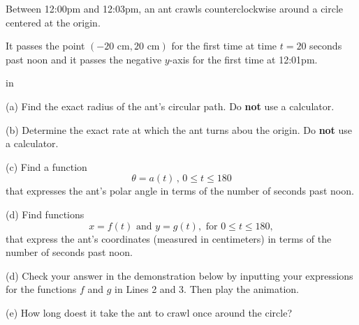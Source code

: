 \documentclass{ximera}
\newcommand{\pskip}{\vskip 0.1 in}
\begin{document}
\begin{question}  \label{Q3dbgdfds5:Motion1}
Between 12:00pm and 12:03pm, an ant crawls counterclockwise around a circle centered at the origin. 

It passes the point $(-20 \text{ cm},20 \text{ cm})$ for the first time at time $t=20$ seconds past noon and it passes the negative $y$-axis for the first time at 12:01pm.

\pskip

(a) Find the exact radius of the ant's circular path. Do {\bf not} use a calculator.

(b) Determine the exact rate at which the ant turns abou the origin.  Do {\bf not} use a calculator.

(c) Find a function 
\[
   \theta = a(t) \, , \, 0\leq t \leq 180
\]
that expresses the ant's polar angle in terms of the number of seconds past noon.

(d) Find functions
\[
   x = f(t) \text{ and } y=g(t) , \text{ for } 0\leq t \leq 180 ,
\]
that express the ant's coordinates (measured in centimeters) in terms of the number of seconds past noon. 

(d) Check your answer in the demonstration below by inputting your expressions for the functions $f$ and $g$ in Lines 2 and 3. Then play the animation.

(e) How long doest it take the ant to crawl once around the circle?

 
\begin{onlineOnly}
    \begin{center}
\end{center}
\end{onlineOnly}


\end{question}
\end{document}
